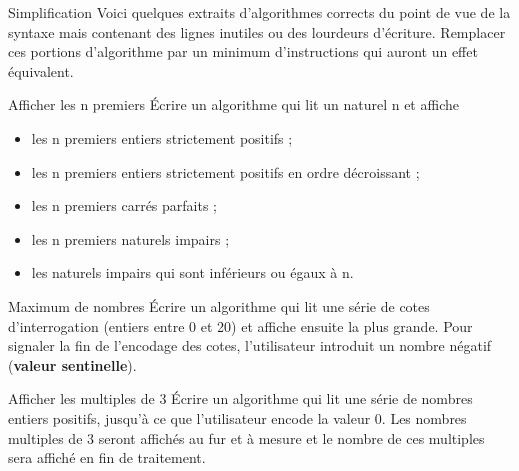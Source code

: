 \begin{Exercice}{Simplification}
	Voici quelques extraits d’algorithmes corrects du point de vue de la
	syntaxe mais contenant des lignes inutiles ou des lourdeurs d’écriture.
	Remplacer ces portions d’algorithme par un minimum d’instructions qui
	auront un effet équivalent.




\end{Exercice}

\begin{Exercice}{Afficher les n premiers}
	Écrire un algorithme qui lit un naturel n et affiche
	
	\begin{itemize}
	\item {
	les n premiers entiers strictement positifs ;}
	\item {
	les n premiers entiers strictement positifs en ordre décroissant ;}
	\item {
	les n premiers carrés parfaits ;}
	\item {
	les n premiers naturels impairs ;}
	\item {
	les naturels impairs qui sont inférieurs ou égaux à n.}
	\end{itemize}
\end{Exercice}

\begin{Exercice}{Maximum de nombres}
	Écrire un algorithme qui lit une série de cotes d’interrogation (entiers
	entre 0 et 20) et affiche ensuite la plus grande. Pour signaler la fin
	de l’encodage des cotes, l’utilisateur introduit un nombre négatif
	(\textbf{valeur sentinelle}).
\end{Exercice}

\begin{Exercice}{Afficher les multiples de 3}
	Écrire un algorithme qui lit une série de nombres entiers positifs,
	jusqu’à ce que l’utilisateur encode la valeur 0. Les nombres multiples
	de 3 seront affichés au fur et à mesure et le nombre de ces multiples
	sera affiché en fin de traitement.
\end{Exercice}


